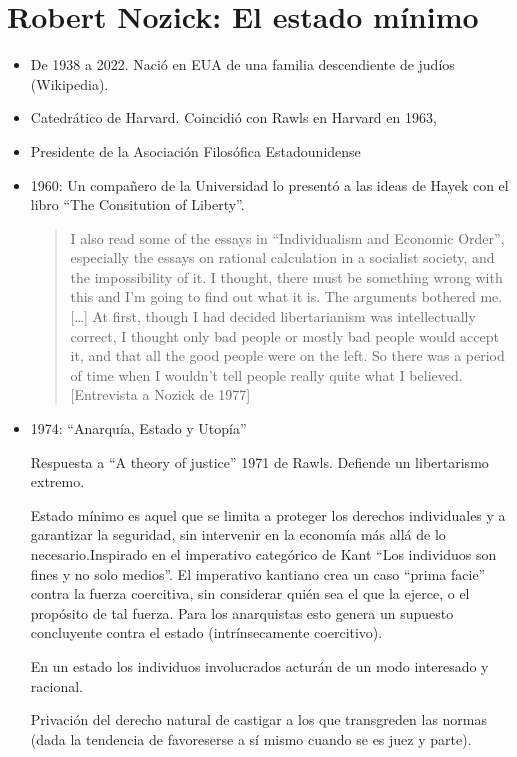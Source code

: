 \documentclass[
  letterpaper,
  DIV=11,
  numbers=noendperiod]{scrreprt}
\begin{document}
\section{Robert Nozick: El estado
mínimo}\label{robert-nozick-el-estado-muxednimo}

\begin{itemize}
\item
  De 1938 a 2022. Nació en EUA de una familia descendiente de judíos
  (Wikipedia).
\item
  Catedrático de Harvard. Coincidió con Rawls en Harvard en 1963,
\item
  Presidente de la Asociación Filosófica Estadounidense
\item
  1960: Un compañero de la Universidad lo presentó a las ideas de Hayek
  con el libro ``The Consitution of Liberty''.

  \begin{quote}
  I also read some of the essays in ``Individualism and Economic
  Order'', especially the essays on rational calculation in a socialist
  society, and the impossibility of it. I thought, there must be
  something wrong with this and I'm going to find out what it is. The
  arguments bothered me. {[}\ldots{]} At first, though I had decided
  libertarianism was intellectually correct, I thought only bad people
  or mostly bad people would accept it, and that all the good people
  were on the left. So there was a period of time when I wouldn't tell
  people really quite what I believed. {[}Entrevista a Nozick de 1977{]}
  \end{quote}
\item
  1974: ``Anarquía, Estado y Utopía''

  Respuesta a ``A theory of justice'' 1971 de Rawls. Defiende un
  libertarismo extremo.

  Estado mínimo es aquel que se limita a proteger los derechos
  individuales y a garantizar la seguridad, sin intervenir en la
  economía más allá de lo necesario.Inspirado en el imperativo
  categórico de Kant ``Los individuos son fines y no solo medios''. El
  imperativo kantiano crea un caso ``prima facie'' contra la fuerza
  coercitiva, sin considerar quién sea el que la ejerce, o el propósito
  de tal fuerza. Para los anarquistas esto genera un supuesto
  concluyente contra el estado (intrínsecamente coercitivo).

  En un estado los individuos involucrados acturán de un modo interesado
  y racional.

  Privación del derecho natural de castigar a los que transgreden las
  normas (dada la tendencia de favoreserse a sí mismo cuando se es juez
  y parte).


\end{itemize}
\end{document}
